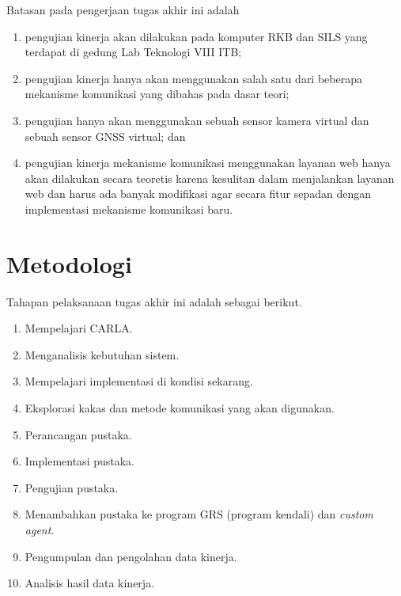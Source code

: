 Batasan pada pengerjaan tugas akhir ini adalah

\begin{enumerate}
	\item pengujian kinerja akan dilakukan pada komputer RKB dan SILS yang
	      terdapat di gedung Lab Teknologi VIII ITB;
	\item pengujian kinerja hanya akan menggunakan salah satu dari beberapa
	      mekanisme komunikasi yang dibahas pada dasar teori;
	\item pengujian hanya akan menggunakan sebuah sensor kamera virtual dan
	      sebuah sensor GNSS virtual; dan
	\item pengujian kinerja mekanisme komunikasi menggunakan layanan web hanya akan
	      dilakukan secara teoretis karena kesulitan dalam menjalankan layanan web
	      dan harus ada banyak modifikasi agar secara fitur sepadan dengan
	      implementasi mekanisme komunikasi baru.
\end{enumerate}

\section{Metodologi}


Tahapan pelaksanaan tugas akhir ini adalah sebagai berikut.

\begin{enumerate}
	\item Mempelajari CARLA.
	\item Menganalisis kebutuhan sistem.
	\item Mempelajari implementasi di kondisi sekarang.
	\item Eksplorasi kakas dan metode komunikasi yang akan digunakan.
	\item Perancangan pustaka.
	\item Implementasi pustaka.
	\item Pengujian pustaka.
	\item Menambahkan pustaka ke program GRS (program kendali) dan
	      \textit{custom agent}.
	\item Pengumpulan dan pengolahan data kinerja.
	\item Analisis hasil data kinerja.
\end{enumerate}

